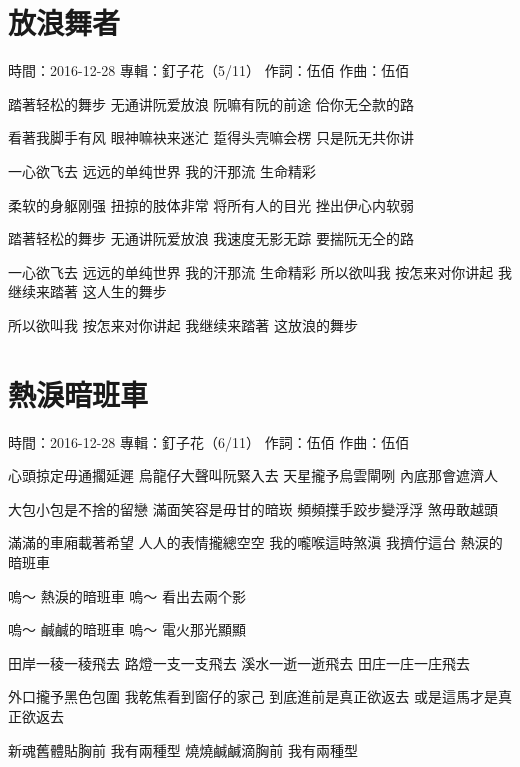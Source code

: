 \documentclass[UTF8,a4paper,oneside,twocolumn,12pt]{ctexbook}
\newcommand{\infopair}[2]{\textbullet #1：#2}
\newcommand{\zc}[1][伍佰]{\infopair{作詞}{#1}}
\newcommand{\zq}[1][伍佰]{\infopair{作曲}{#1}}
\newcommand{\zj}[1]{\infopair{專輯}{#1}}
\newcommand{\sj}[1]{\infopair{時間}{#1}}
\newenvironment{info}{\begin{flushleft}\kaishu
	}
	{\end{flushleft}\normalsize\yahei\par}
\newenvironment{lyric}{
	}
{}
\begin{document}
\section{放浪舞者}
\begin{info}
	\sj{2016-12-28}
	\zj{釘子花（5/11）}
	\zc
	\zq
\end{info}
\begin{lyric}
	踏著轻松的舞步
	无通讲阮爱放浪
	阮嘛有阮的前途
	佮你无仝款的路

	看著我脚手有风
	眼神嘛袂来迷汒
	踅得头壳嘛会楞
	只是阮无共你讲

	一心欲飞去 远远的单纯世界
	我的汗那流 生命精彩

	柔软的身躯刚强
	扭掠的肢体非常
	将所有人的目光
	挫出伊心内软弱

	踏著轻松的舞步
	无通讲阮爱放浪
	我速度无影无踪
	要揣阮无仝的路

	一心欲飞去 远远的单纯世界
	我的汗那流 生命精彩
	所以欲叫我 按怎来对你讲起
	我继续来踏著 这人生的舞步

	所以欲叫我 按怎来对你讲起
	我继续来踏著 这放浪的舞步
\end{lyric}

\section{熱淚暗班車}
\begin{info}
	\sj{2016-12-28}
	\zj{釘子花（6/11）}
	\zc
	\zq
\end{info}
\begin{lyric}
	心頭掠定毋通擱延遲
	烏龍仔大聲叫阮緊入去
	天星攏予烏雲閘咧
	內底那會遮濟人

	大包小包是不捨的留戀
	滿面笑容是毋甘的暗崁
	頻頻擛手跤步變浮浮
	煞毋敢越頭

	滿滿的車廂載著希望
	人人的表情攏總空空
	我的嚨喉這時煞滇
	我擠佇這台 熱涙的暗班車

	嗚～ 熱淚的暗班車
	嗚～ 看出去兩个影


	嗚～ 鹹鹹的暗班車
	嗚～ 電火那光顯顯

	田岸一稜一稜飛去
	路燈一支一支飛去
	溪水一逝一逝飛去
	田庄一庄一庄飛去

	外口攏予黑色包圍
	我乾焦看到窗仔的家己
	到底進前是真正欲返去
	或是這馬才是真正欲返去

	新魂舊體貼胸前 我有兩種型
	燒燒鹹鹹滴胸前 我有兩種型
\end{lyric}
\end{document}

